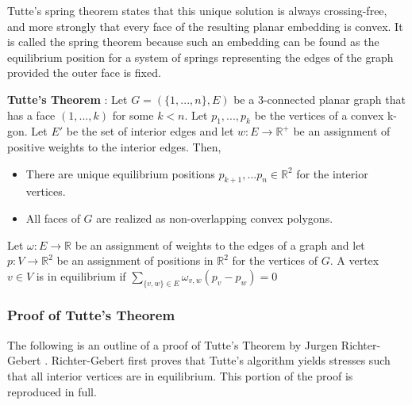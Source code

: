 \documentclass[11pt]{article}
\newcommand{\R}{\mathbb{R}}
\begin{document}
  Tutte's spring theorem states that this unique solution is always crossing-free, and more strongly that every face of the resulting planar embedding is convex. It is called the spring theorem because such an embedding can be found as the equilibrium position for a system of springs representing the edges of the graph provided the outer face is fixed.
 
 \textbf{Tutte's Theorem} \cite{realizationSpaces}: Let $G = (\{1,...,n\},E)$ be a 3-connected planar graph that has a face $(1,...,k)$ for some $k<n$. Let $p_1,...,p_k$ be the vertices of a convex k-gon. Let $E'$ be the set of interior edges and let $w : E \rightarrow \R^+$ be an assignment of positive weights to the interior edges. Then,
 	\begin{itemize}
		\item There are unique equilibrium positions $p_{k+1}, ...p_n \in \R^2$ for the interior vertices. 
		\item All faces of $G$ are realized as non-overlapping convex polygons.
	\end{itemize}
	
Let $\omega : E \rightarrow \R$ be an assignment of weights to the edges of a graph and let $p:V \rightarrow \R^2$ be an assignment of positions in $\R^2$ for the vertices of $G$. A vertex $v \in V$ is in equilibrium if  $\sum\limits_{\{v,w\} \in E} \omega_{v,w}(p_v - p_w) = 0$

\subsubsection{Proof of Tutte's Theorem}
The following is an outline of a proof of Tutte's Theorem by Jurgen Richter-Gebert \cite{realizationSpaces}. Richter-Gebert first proves that Tutte's algorithm yields stresses such that all interior vertices are in equilibrium. This portion of the proof is reproduced in full.
\end{document}
